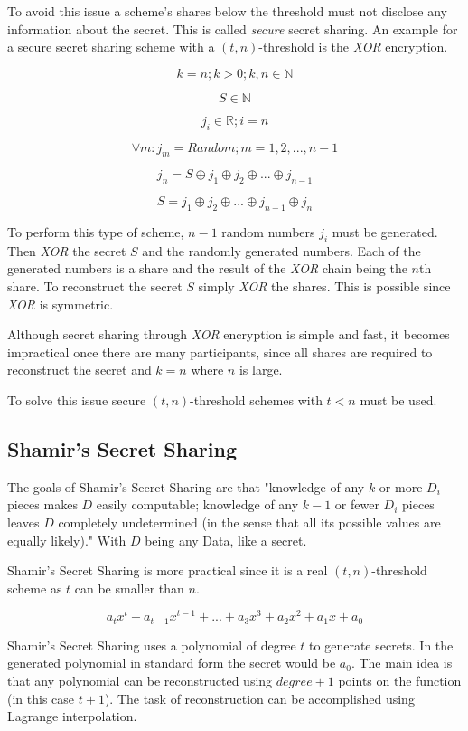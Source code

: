 To avoid this issue a scheme's shares below the threshold must not disclose any
information about the secret. This is called \textit{secure} secret sharing.
An example for a secure secret sharing scheme with a $(t, n)$-threshold is the
\textit{XOR} encryption.

$$k = n; k > 0;k, n \in \mathbb{N}$$

$$S \in \mathbb{N}$$

$$j_{i} \in \mathbb{R}; i = n$$

$$\forall m: j_{m} = Random; m = {1, 2, ..., n-1}$$

$$j_{n} = S \oplus j_{1} \oplus j_{2} \oplus ... \oplus j_{n-1} $$

$$S = j_{1} \oplus j_{2} \oplus ... \oplus j_{n-1} \oplus j_{n} $$

To perform this type of scheme, $n-1$ random numbers $j_{i}$ must be generated.
Then \textit{XOR} the secret $S$ and the randomly generated numbers. Each of
the generated numbers is a share and the result of the \textit{XOR} chain being
the $n$th share. To reconstruct the secret $S$ simply \textit{XOR} the shares.
This is possible since \textit{XOR} is symmetric.

Although secret sharing through \textit{XOR} encryption is simple and fast, it
becomes impractical once there are many participants, since all shares are
required to reconstruct the secret and $k = n$ where $n$ is large.

To solve this issue secure $(t, n)$-threshold schemes with $t < n$ must be
used.

\subsection{Shamir's Secret Sharing}

The goals of Shamir's Secret Sharing are that "knowledge of any $k$ or more
$D_i$ pieces makes $D$ easily computable; knowledge of any $k - 1$ or fewer
$D_i$ pieces leaves $D$ completely undetermined (in the sense that all its
possible values are equally likely)." With $D$ being any Data, like a secret.

Shamir's Secret Sharing is more practical since it is a real $(t, n)$-threshold
scheme as $t$ can be smaller than $n$.

$$a_{t}x^t + a_{t-1}x^{t-1} + ... + a_{3}x^3 + a_{2}x^2 + a_{1}x + a_0 $$

Shamir's Secret Sharing uses a polynomial of degree $t$ to generate secrets.
In the generated polynomial in standard form the secret would be $a_0$. The
main idea is that any polynomial can be reconstructed using $degree + 1$ points
on the function (in this case $t + 1$). The task of reconstruction can be accomplished using Lagrange
interpolation.

